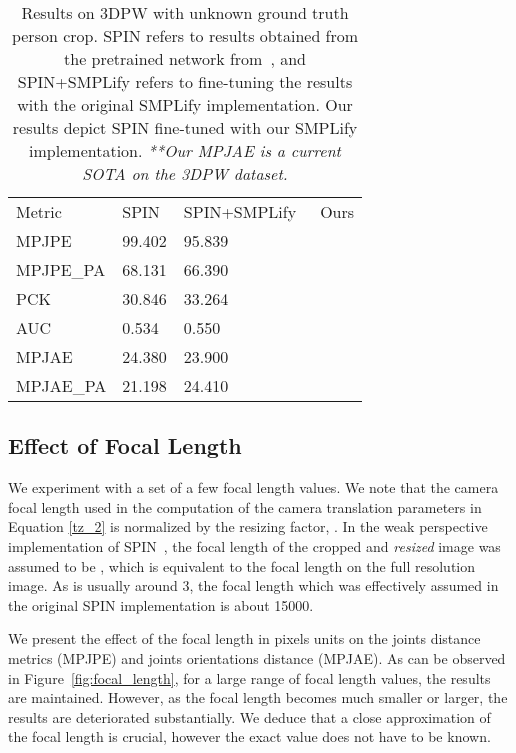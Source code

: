 \documentclass[runningheads]{llncs}
\begin{document}
\setlength{\tabcolsep}{4pt}
\begin{table}
	\begin{center}
		\caption{Results on 3DPW  with unknown ground truth person crop. SPIN refers to results obtained from the pretrained network from~\cite{kolotouros2019learning}, and SPIN+SMPLify refers to fine-tuning the results with the original SMPLify implementation. Our results depict SPIN fine-tuned with our SMPLify implementation. \emph{**Our MPJAE is a current SOTA on the 3DPW dataset.} }
		\label{table:results_ours}
		\begin{tabular}{llll}
			\hline\noalign{\smallskip}
			Metric &  SPIN~\cite{kolotouros2019learning} &SPIN+SMPLify~\cite{kolotouros2019learning} & Ours \\
			\noalign{\smallskip}
			\hline
			\noalign{\smallskip}
			MPJPE  & 99.402 & 95.839 & \\
			{MPJPE\_PA} & 68.131 & 66.390 & \\
			PCK & 30.846& 33.264 & \\
			AUC & 0.534 & 0.550 & \\
			MPJAE & 24.380 & 23.900 & \\
			{MPJAE\_PA} & 21.198 & 24.410 & \\
			\hline
		\end{tabular}
	\end{center}
\end{table}
\setlength{\tabcolsep}{1.4pt}





\subsection{Effect of Focal Length}
\label{sec:focal_length}

We experiment with a set of a few focal length values. We note that the camera focal length used in the computation of the camera translation parameters in Equation \ref{tz_2} is normalized by the resizing factor, .  In the weak perspective implementation of SPIN~\cite{kolotouros2019learning}, the  focal length of the cropped and \emph{resized} image was assumed to be ,  which is equivalent to the focal length  on the full resolution image. As  is usually around 3, the focal length which was effectively assumed in the original SPIN implementation is about 15000.   

We present the effect of the focal length in pixels units on the joints distance metrics (MPJPE) and joints orientations distance (MPJAE). As can be observed in Figure~\ref{fig:focal_length}, for a large range of focal length values, the results are maintained. However, as the focal length becomes much smaller or larger, the results are deteriorated substantially. We deduce that a close approximation of the focal length is crucial, however the exact value does not have to be known.
\end{document}
